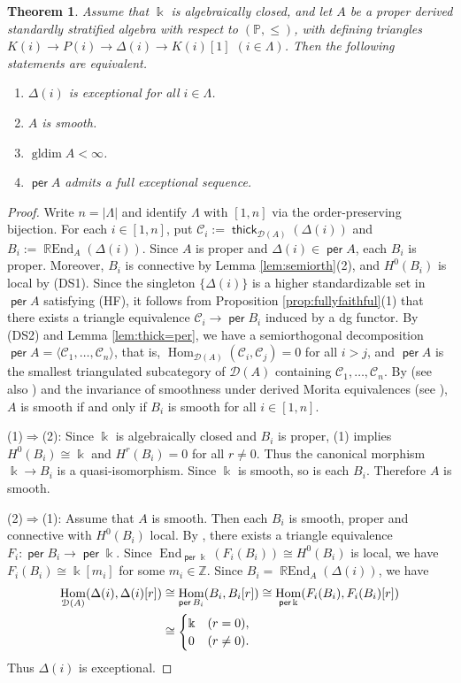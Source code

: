\documentclass[a4paper,reqno,11pt]{amsart}
\numberwithin{equation}{section}
\newtheorem{theorem}{Theorem}[section]
\theoremstyle{definition}
\newcommand{\C}{\mathcal{C}}
\newcommand{\D}{\mathcal{D}}
\newcommand{\ZZ}{\mathbb{Z}}
\newcommand{\PP}{\mathbb{P}}
\newcommand{\bde}{\Delta}
\newcommand{\kk}{\Bbbk}
\DeclareMathOperator{\gldim}{gldim}
\DeclareMathOperator{\thick}{\mathsf{thick}}
\DeclareMathOperator{\per}{\mathsf{per}}
\DeclareMathOperator{\End}{End}
\DeclareMathOperator{\REnd}{\mathbb{R}End}
\DeclareMathOperator{\Hom}{Hom}
\begin{document}
\begin{theorem}\label{thm:dgqh}
Assume that $\kk$ is algebraically closed, and let $A$ be a proper derived standardly stratified algebra with respect to $(\PP,\leq)$, with defining triangles $K(i)\to P(i)\to\bde(i)\to K(i)[1]$ $(i\in\Lambda)$.
Then the following statements are equivalent.
\begin{enumerate}
\item $\bde(i)$ is exceptional for all $i\in \Lambda$.
\item $A$ is smooth.
\item $\gldim A<\infty$.
\item $\per A$ admits a full exceptional sequence.
\end{enumerate}
\end{theorem}
\begin{proof}
Write $n=|\Lambda|$ and identify $\Lambda$ with $[1,n]$ via the order-preserving bijection.
For each $i\in[1,n]$, put $\C_{i}:=\thick_{\D(A)}(\bde(i))$ and $B_{i}:=\REnd_{A}(\bde(i))$.
Since $A$ is proper and $\bde(i)\in\per A$, each $B_{i}$ is proper.
Moreover, $B_{i}$ is connective by Lemma \ref{lem:semiorth}(2), and $H^{0}(B_{i})$ is local by (DS1).
Since the singleton $\{\bde(i)\}$ is a higher standardizable set in $\per A$ satisfying (HF), it follows from Proposition \ref{prop:fullyfaithful}(1) that there exists a triangle equivalence $\C_{i}\to\per B_{i}$ induced by a dg functor.
By (DS2) and Lemma \ref{lem:thick=per}, we have a semiorthogonal decomposition $\per A=\langle\C_{1},\ldots,\C_{n}\rangle$, that is, $\Hom_{\D(A)}(\C_{i},\C_{j})=0$ for all $i>j$, and $\per A$ is the smallest triangulated subcategory of $\D(A)$ containing $\C_{1},\ldots,\C_{n}$.
By \cite[Proposition 2.11]{E17} (see also \cite{LS14}) and the invariance of smoothness under derived Morita equivalences (see \cite[Section 4.7]{K06}), $A$ is smooth if and only if $B_{i}$ is smooth for all $i\in[1,n]$.

(1)$\Rightarrow$(2): Since $\kk$ is algebraically closed and $B_{i}$ is proper, (1) implies $H^{0}(B_{i})\cong\kk$ and $H^{r}(B_{i})=0$ for all $r\neq 0$.
Thus the canonical morphism $\kk\to B_{i}$ is a quasi-isomorphism.
Since $\kk$ is smooth, so is each $B_{i}$. Therefore $A$ is smooth.

(2)$\Rightarrow$(1): Assume that $A$ is smooth.
Then each $B_{i}$ is smooth, proper and connective with $H^{0}(B_{i})$ local.
By \cite[Corollary 7.5]{RS22}, there exists a triangle equivalence $F_{i}:\per B_{i}\to\per\kk$.
Since $\End_{\per\kk}(F_{i}(B_{i}))\cong H^{0}(B_{i})$ is local, we have $F_{i}(B_{i})\cong\kk[m_{i}]$ for some $m_{i}\in\ZZ$.
Since $B_{i}=\REnd_{A}(\bde(i))$, we have
\begin{align}
\Hom_{\D(A)}(\bde(i),\bde(i)[r])
&\cong\Hom_{\per B_{i}}(B_{i},B_{i}[r])\cong\Hom_{\per\kk}(F_{i}(B_{i}),F_{i}(B_{i})[r])\notag\\
&\cong
\begin{cases}
\kk & (r=0),\\
0 & (r\neq 0).
\end{cases}\notag
\end{align}
Thus $\bde(i)$ is exceptional.


\end{proof}
\end{document}
